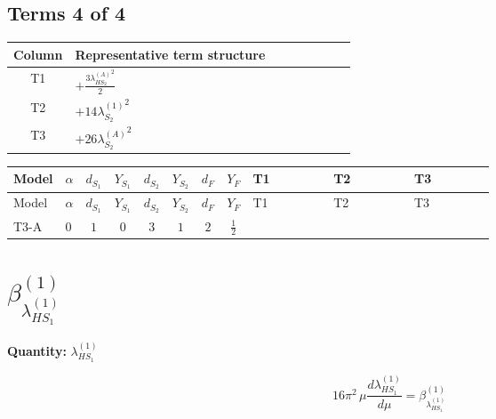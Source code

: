 \documentclass[8pt]{article}
\begin{document}
\begin{landscape}
\subsection*{Terms 4 of 4}
\begin{center}
\begin{tabular}{@{}c >{\raggedright\arraybackslash}p{0.82\linewidth}@{}}
\toprule
Column & Representative term structure \\
\midrule
T1 & \(\displaystyle +\frac{3 {\lambda_{HS_2}^{(A)}}^2}{2}\) \\
\midrule
T2 & \(\displaystyle +14 {\lambda_{S_2}^{(1)}}^2\) \\
\midrule
T3 & \(\displaystyle +26 {\lambda_{S_2}^{(A)}}^2\) \\
\midrule
\bottomrule
\end{tabular}
\end{center}
\smallskip
\tiny
\begin{longtable}{@{}llcccccc >{\raggedright\arraybackslash}p{0.21\linewidth} >{\raggedright\arraybackslash}p{0.21\linewidth} >{\raggedright\arraybackslash}p{0.21\linewidth}@{}}
\toprule
Model & $\alpha$ & $d_{S_1}$ & $Y_{S_1}$ & $d_{S_2}$ & $Y_{S_2}$ & $d_F$ & $Y_F$ & T1 & T2 & T3 \\
\midrule
\endfirsthead
\toprule
Model & $\alpha$ & $d_{S_1}$ & $Y_{S_1}$ & $d_{S_2}$ & $Y_{S_2}$ & $d_F$ & $Y_F$ & T1 & T2 & T3 \\
\midrule
\endhead
T3-A & $0$ & $1$ & $0$ & $3$ & $1$ & $2$ & $\frac{1}{2}$ & \scriptsize\adjustbox{max width=\linewidth}{$\begin{gathered} +\frac{3 {\lambda_{HS_2}^{(A)}}^2}{2}\end{gathered}$} & \scriptsize\adjustbox{max width=\linewidth}{$\begin{gathered} +14 {\lambda_{S_2}^{(1)}}^2\end{gathered}$} & \scriptsize\adjustbox{max width=\linewidth}{$\begin{gathered} +26 {\lambda_{S_2}^{(A)}}^2\end{gathered}$} \\
\midrule
\bottomrule
\end{longtable}
\clearpage
\section*{$\beta_{\lambda_{HS_1}^{(1)}}^{(1)}$}
\noindent\textbf{Quantity: }$\lambda_{HS_1}^{(1)}$\par\smallskip
\[16\pi^2\,\mu\frac{d \lambda_{HS_1}^{(1)}}{d\mu}=\beta_{\lambda_{HS_1}^{(1)}}^{(1)}\]

\end{landscape}
\end{document}
